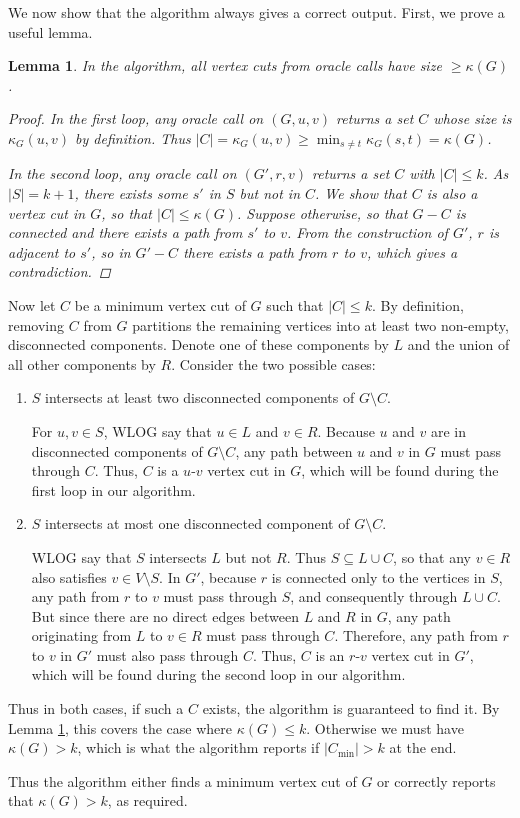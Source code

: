 \documentclass[12pt]{article}
\newtheorem{lemma}{Lemma}
\begin{document}
\begin{enumerate}[label=\alph*., font=\bfseries]
We now show that the algorithm always gives a correct output. First, we prove a useful lemma.
\begin{lemma}\label{p4}
In the algorithm, all vertex cuts from oracle calls have size $\ge\kappa(G)$.
\begin{proof}
In the first loop, any oracle call on $(G,u,v)$ returns a set $C$ whose size is $\kappa_G(u,v)$ by definition. Thus $|C|=\kappa_G(u,v)\ge\min_{s\ne t}\kappa_G(s, t)=\kappa(G)$.

In the second loop, any oracle call on $(G',r,v)$ returns a set $C$ with $|C|\le k$. As $|S|=k+1$, there exists some $s'$ in $S$ but not in $C$. We show that $C$ is also a vertex cut in $G$, so that $|C|\le\kappa(G)$. Suppose otherwise, so that $G-C$ is connected and there exists a path from $s'$ to $v$. From the construction of $G'$, $r$ is adjacent to $s'$, so in $G'-C$ there exists a path from $r$ to $v$, which gives a contradiction.
\end{proof}
\end{lemma}
Now let $C$ be a minimum vertex cut of $G$ such that $|C| \le k$. By definition, removing $C$ from $G$ partitions the remaining vertices into at least two non-empty, disconnected components. Denote one of these components by $L$ and the union of all other components by $R$. Consider the two possible cases:
\begin{enumerate}
\item $S$ intersects at least two disconnected components of $G \setminus C$.

For $u,v\in S$, WLOG say that $u\in L$ and $v\in R$. Because $u$ and $v$ are in disconnected components of $G \setminus C$, any path between $u$ and $v$ in $G$ must pass through $C$. Thus, $C$ is a $u$-$v$ vertex cut in $G$, which will be found during the first loop in our algorithm.
\item $S$ intersects at most one disconnected component of $G \setminus C$.

WLOG say that $S$ intersects $L$ but not $R$. Thus $S\subseteq L \cup C$, so that any $v \in R$ also satisfies $v \in V \setminus S$. In $G'$, because $r$ is connected only to the vertices in $S$, any path from $r$ to $v$ must pass through $S$, and consequently through $L \cup C$. But since there are no direct edges between $L$ and $R$ in $G$, any path originating from $L$ to $v \in R$ must pass through $C$. Therefore, any path from $r$ to $v$ in $G'$ must also pass through $C$. Thus, $C$ is an $r$-$v$ vertex cut in $G'$, which will be found during the second loop in our algorithm.
\end{enumerate}
Thus in both cases, if such a $C$ exists, the algorithm is guaranteed to find it. By Lemma \ref{p4}, this covers the case where $\kappa(G)\le k$. Otherwise we must have $\kappa(G) > k$, which is what the algorithm reports if $|C_{\min}|>k$ at the end.

Thus the algorithm either finds a minimum vertex cut of $G$ or correctly reports that $\kappa(G) > k$, as required.
\end{enumerate}
\end{document}
